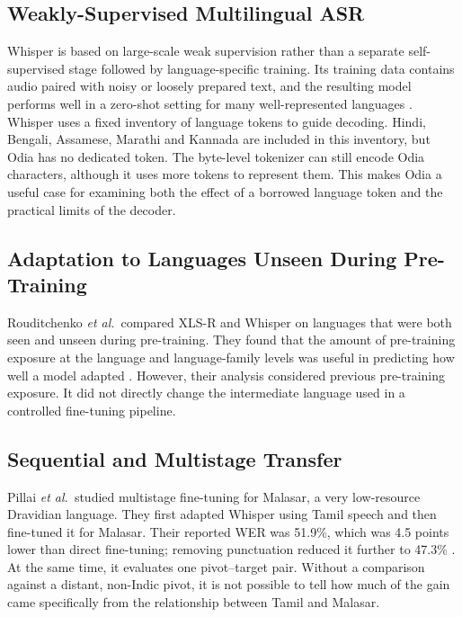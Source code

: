 \documentclass[conference]{IEEEtran}
\begin{document}
\subsection{Weakly-Supervised Multilingual ASR}

Whisper is based on large-scale weak supervision rather than a separate
self-supervised stage followed by language-specific training. Its
training data contains audio paired with noisy or loosely prepared text,
and the resulting model performs well in a zero-shot setting for many
well-represented languages \cite{radford2023whisper}. Whisper uses a
fixed inventory of language tokens to guide decoding. Hindi, Bengali,
Assamese, Marathi and Kannada are included in this inventory, but Odia
has no dedicated token. The byte-level tokenizer can still encode Odia
characters, although it uses more tokens to represent them. This makes
Odia a useful case for examining both the effect of a borrowed language
token and the practical limits of the decoder.

\subsection{Adaptation to Languages Unseen During Pre-Training}

Rouditchenko \emph{et al.}\ compared XLS-R and Whisper on languages that
were both seen and unseen during pre-training. They found that the amount
of pre-training exposure at the language and language-family levels was
useful in predicting how well a model adapted \cite{rouditchenko2023unseen}.
However, their analysis considered previous pre-training exposure. It
did not directly change the intermediate language used in a controlled
fine-tuning pipeline.

\subsection{Sequential and Multistage Transfer}

Pillai \emph{et al.}\ studied multistage fine-tuning for Malasar, a very
low-resource Dravidian language. They first adapted Whisper using Tamil
speech and then fine-tuned it for Malasar. Their reported WER was 51.9\%,
which was 4.5 points lower than direct fine-tuning; removing punctuation
reduced it further to 47.3\% \cite{pillai2026multistage}. At the same
time, it evaluates one pivot--target pair. Without a comparison against
a distant, non-Indic pivot, it is not possible to tell how much of the
gain came specifically from the relationship between Tamil and Malasar.
\end{document}
